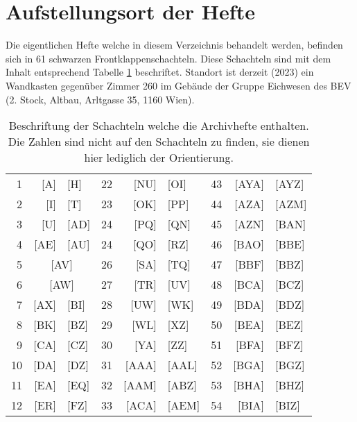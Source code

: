 \documentclass[a4paper]{scrbook}
\begin{document}
\section{Aufstellungsort der Hefte}

Die eigentlichen Hefte welche in diesem Verzeichnis behandelt werden, befinden sich in 61 schwarzen Frontklappenschachteln. Diese Schachteln sind mit dem Inhalt entsprechend Tabelle \ref{TabelleSchachteln}{} beschriftet. Standort ist derzeit (2023) ein Wandkasten gegenüber Zimmer 260  im Gebäude der Gruppe Eichwesen des BEV (2. Stock, Altbau, Arltgasse 35, 1160 Wien).

\begin{table}[ht]
\caption{Beschriftung der Schachteln welche die Archivhefte enthalten. Die Zahlen sind nicht auf den Schachteln zu finden, sie dienen hier lediglich der Orientierung.}
\label{TabelleSchachteln}
\begin{tabular}{rr@{ -- }lrr@{ -- }lrr@{ -- }l}
\\
1  & {[}A{]}&{[}H{]}              & \hspace{15mm}22 & {[}NU{]}&{[}OI{]}   & \hspace{15mm}43 & {[}AYA{]}&{[}AYZ{]} \\
2  & {[}I{]}&{[}T{]}              & 23 & {[}OK{]}&{[}PP{]}   & 44 & {[}AZA{]}&{[}AZM{]} \\
3  & {[}U{]}&{[}AD{]}             & 24 & {[}PQ{]}&{[}QN{]}   & 45 & {[}AZN{]}&{[}BAN{]} \\
4  & {[}AE{]}&{[}AU{]}            & 24 & {[}QO{]}&{[}RZ{]}   & 46 & {[}BAO{]}&{[}BBE{]} \\
5  & \multicolumn{2}{c}{{[}AV{]}} & 26 & {[}SA{]}&{[}TQ{]}   & 47 & {[}BBF{]}&{[}BBZ{]} \\
6  & \multicolumn{2}{c}{{[}AW{]}} & 27 & {[}TR{]}&{[}UV{]}   & 48 & {[}BCA{]}&{[}BCZ{]} \\
7  & {[}AX{]}&{[}BI{]}            & 28 & {[}UW{]}&{[}WK{]}   & 49 & {[}BDA{]}&{[}BDZ{]} \\
8  & {[}BK{]}&{[}BZ{]}            & 29 & {[}WL{]}&{[}XZ{]}   & 50 & {[}BEA{]}&{[}BEZ{]} \\
9  & {[}CA{]}&{[}CZ{]}            & 30 & {[}YA{]}&{[}ZZ{]}   & 51 & {[}BFA{]}&{[}BFZ{]} \\
10 & {[}DA{]}&{[}DZ{]}            & 31 & {[}AAA{]}&{[}AAL{]} & 52 & {[}BGA{]}&{[}BGZ{]} \\
11 & {[}EA{]}&{[}EQ{]}            & 32 & {[}AAM{]}&{[}ABZ{]} & 53 & {[}BHA{]}&{[}BHZ{]} \\
12 & {[}ER{]}&{[}FZ{]}            & 33 & {[}ACA{]}&{[}AEM{]} & 54 & {[}BIA{]}&{[}BIZ{]} \\

\end{tabular}
\end{table}
\end{document}
